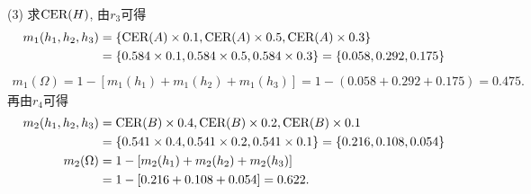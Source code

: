 (3) 求$\textup{CER}(H)$, 由$r_3$可得
\begin{align*}
  m_1({h_1}, {h_2}, {h_3})&=\{\textup{CER}(A)\times 0.1, \textup{CER}(A)\times 0.5, \textup{CER}(A)\times 0.3\}\\
                      &=\{0.584\times 0.1, 0.584\times 0.5, 0.584\times 0.3\}=\{0.058, 0.292, 0.175\}
\end{align*}
\begin{align*}
  m_1(\Omega)=1-[m_1({h_1})+m_1({h_2})+m_1({h_3})] =1-(0.058+0.292+0.175)=0.475.
\end{align*}
再由$r_4$可得
\begin{align*}
  m_2({h_1}, {h_2}, {h_3})&={\textup{CER}(B)\times 0.4, \textup{CER}(B)\times 0.2, \textup{CER}(B)\times 0.1}\\
        &=\{0.541\times 0.4, 0.541\times 0.2, 0.541\times 0.1\}=\{0.216, 0.108, 0.054\}\\
  m_2(\Omega) &=1-[m_2({h_1})+m_2({h_2})+m_2({h_3})]\\
              &=1-[0.216+0.108+0.054]=0.622.
\end{align*}


